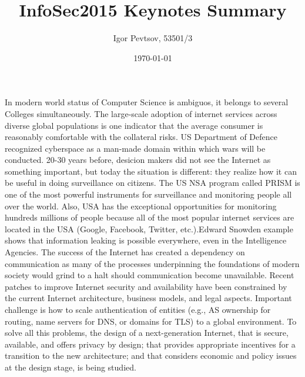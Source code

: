 \documentclass[14pt]{article}
\title{InfoSec2015 Keynotes Summary}
\date{\today}
\author{Igor Pevtsov, 53501/3}
\begin{document}
  	\maketitle

	In modern world status of Computer Science is ambiguos, it belongs to several Colleges simultaneously. The large-scale adoption of internet services across diverse global populations is one indicator that the average consumer is reasonably comfortable with the collateral risks. US Department of Defence recognized cyberspace as a man-made domain within which wars will be conducted. 20-30 years before, desicion makers did not  see the Internet as something important, but today the situation is different: they realize how it can be useful in doing surveillance on citizens. The US NSA program called PRISM is one of the most powerful instruments for surveillance and monitoring people all over the world. Also, USA has the exceptional opportunities for monitoring hundreds millions of people because all of the most popular internet services are located in the USA (Google, Facebook, Twitter, etc.).Edward Snowden example shows that information leaking is possible everywhere, even in the Intelligence Agencies.
	 The success of the Internet has created a dependency on communication as many of the processes underpinning the foundations of modern society would grind to a halt should communication become unavailable. Recent patches to improve Internet security and availability have been constrained by the current Internet architecture, business models, and legal aspects. Important challenge is how to scale authentication of entities (e.g., AS ownership for routing, name servers for DNS, or domains for TLS) to a global environment. To solve all this problems, the design of a next-generation Internet, that is secure, available, and offers privacy by design; that provides appropriate incentives for a transition to the new architecture; and that considers economic and policy issues at the design stage, is being studied.
\end{document}
